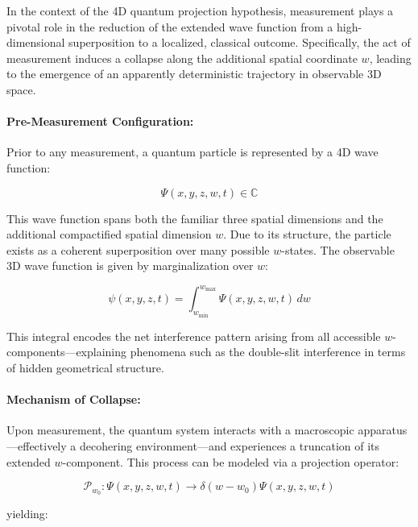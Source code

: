 \documentclass[12pt]{article}
\begin{document}
In the context of the 4D quantum projection hypothesis, measurement plays a pivotal role in the reduction of the extended wave function from a high-dimensional superposition to a localized, classical outcome. Specifically, the act of measurement induces a collapse along the additional spatial coordinate \( w \), leading to the emergence of an apparently deterministic trajectory in observable 3D space.

\paragraph{Pre-Measurement Configuration:}

Prior to any measurement, a quantum particle is represented by a 4D wave function:

\begin{equation}
\Psi(x, y, z, w, t) \in \mathbb{C}
\end{equation}

This wave function spans both the familiar three spatial dimensions and the additional compactified spatial dimension \( w \). Due to its structure, the particle exists as a coherent superposition over many possible \( w \)-states. The observable 3D wave function is given by marginalization over \( w \):

\begin{equation}
\psi(x, y, z, t) = \int_{w_{\text{min}}}^{w_{\text{max}}} \Psi(x, y, z, w, t) \, dw
\end{equation}

This integral encodes the net interference pattern arising from all accessible \( w \)-components—explaining phenomena such as the double-slit interference in terms of hidden geometrical structure.

\paragraph{Mechanism of Collapse:}

Upon measurement, the quantum system interacts with a macroscopic apparatus—effectively a decohering environment—and experiences a truncation of its extended \( w \)-component. This process can be modeled via a projection operator:

\begin{equation}
\mathcal{P}_{w_0}: \Psi(x, y, z, w, t) \longrightarrow \delta(w - w_0)\Psi(x, y, z, w, t)
\end{equation}

yielding:
\end{document}
